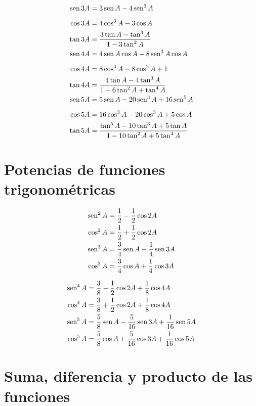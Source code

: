 \begin{align*}
	\operatorname{sen} 3A &= 3\operatorname{sen} A - 4\operatorname{sen}^3 A \\[5pt]
	\cos 3A &= 4\cos^3 A - 3\cos A  \\
	\tan 3A &= \frac{3\tan A-\tan^3 A}{1-3\tan^2 A}\\
	\operatorname{sen} 4A &= 4\operatorname{sen} A \cos A - 8 \operatorname{sen}^3 A \cos A \\[5pt]
	\cos 4A &= 8\cos^4 A - 8\cos^2 A + 1 \\
	\tan 4A &= \frac{4\tan A - 4\tan^3 A}{1-6\tan^2 A + \tan^4 A}\\
	\operatorname{sen} 5A &= 5\operatorname{sen} A - 20\operatorname{sen}^3 A +16\operatorname{sen}^5 A\\[5pt]
	\cos 5A &= 16\cos^3 A - 20\cos^3 A +5\cos A \\
	\tan 5A &= \frac{\tan^5 A - 10\tan^3 A + 5\tan A}{1-10\tan^2 A + 5\tan^4 A}
\end{align*}

\section*{Potencias de funciones trigonométricas}

\begin{minipage}[c]{0.5\textwidth}
\begin{align*}
\operatorname{sen}^2 A &= \frac{1}{2}- \frac{1}{2} \cos 2A\\
\cos^2 A &= \frac{1}{2}+ \frac{1}{2} \cos 2A\\
\operatorname{sen}^3 A &= \frac{3}{4}\operatorname{sen} A- \frac{1}{4} \operatorname{sen} 3A\\
\cos^3 A &= \frac{3}{4}\cos A+ \frac{1}{4} \cos 3A
\end{align*}

\end{minipage} 
\begin{minipage}[c]{0.5\textwidth}
\begin{align*}
\operatorname{sen}^4 A &= \frac{3}{8}- \frac{1}{2} \cos 2A + \frac{1}{8}\cos 4A\\
\cos^4 A &= \frac{3}{8}+ \frac{1}{2} \cos 2A + \frac{1}{8}\cos 4A\\
\operatorname{sen}^5 A &= \frac{5}{8}\operatorname{sen} A- \frac{5}{16} \operatorname{sen} 3A + \frac{1}{16}\operatorname{sen} 5A\\
\cos^5 A &= \frac{5}{8}\cos A+ \frac{5}{16} \cos 3A + \frac{1}{16}\cos 5A
\end{align*}
\end{minipage}

\section*{Suma, diferencia y producto de las funciones}


